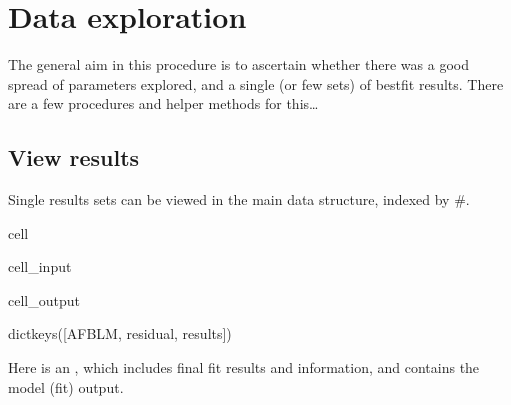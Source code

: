 \documentclass[letterpaper,table,10pt,english]{jupyterBook}
\begin{document}
\section{Data exploration}
\label{\detokenize{part2/case-study-N2_290723:data-exploration}}
\sphinxAtStartPar
The general aim in this procedure is to ascertain whether there was a good spread of parameters explored, and a single (or few sets) of best\sphinxhyphen{}fit results. There are a few procedures and helper methods for this…


\subsection{View results}
\label{\detokenize{part2/case-study-N2_290723:view-results}}
\sphinxAtStartPar
Single results sets can be viewed in the main data structure, indexed by \#.

\begin{sphinxuseclass}{cell}\begin{sphinxVerbatimInput}

\begin{sphinxuseclass}{cell_input}
\begin{sphinxVerbatim}[commandchars=\\\{\}]
  
\PYG{p}{[}\PYG{p}{]}
\end{sphinxVerbatim}

\end{sphinxuseclass}\end{sphinxVerbatimInput}
\begin{sphinxVerbatimOutput}

\begin{sphinxuseclass}{cell_output}
\begin{sphinxVerbatim}[commandchars=\\\{\}]
dict\PYGZus{}keys([\PYGZsq{}AFBLM\PYGZsq{}, \PYGZsq{}residual\PYGZsq{}, \PYGZsq{}results\PYGZsq{}])
\end{sphinxVerbatim}

\end{sphinxuseclass}\end{sphinxVerbatimOutput}

\end{sphinxuseclass}
\sphinxAtStartPar
Here  is an , which includes final fit results and information, and  contains the model (fit) output.
\end{document}
